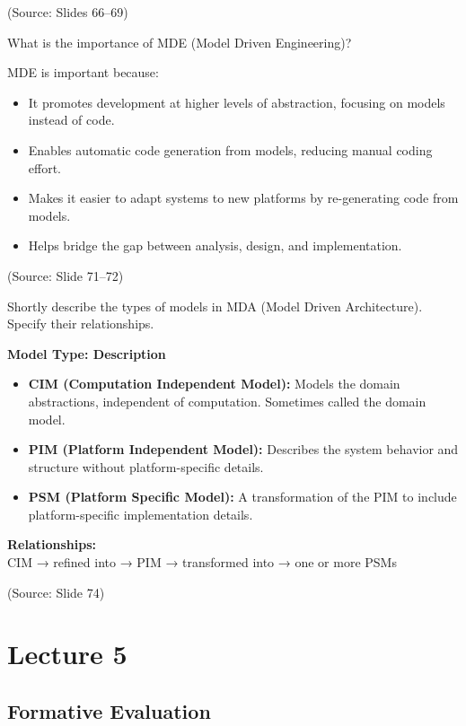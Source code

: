 \documentclass[12pt]{article}
\begin{document}
(Source: Slides 66--69)

\begin{questionbox}
What is the importance of MDE (Model Driven Engineering)?
\end{questionbox}

MDE is important because:
\begin{itemize}
    \item It promotes development at higher levels of abstraction, focusing on models instead of code.
    \item Enables automatic code generation from models, reducing manual coding effort.
    \item Makes it easier to adapt systems to new platforms by re-generating code from models.
    \item Helps bridge the gap between analysis, design, and implementation.
\end{itemize}

(Source: Slide 71--72)

\begin{questionbox}
Shortly describe the types of models in MDA (Model Driven Architecture). Specify their relationships.
\end{questionbox}

\textbf{Model Type: Description}
\begin{itemize}
    \item \textbf{CIM (Computation Independent Model):} Models the domain abstractions, independent of computation. Sometimes called the domain model.
    \item \textbf{PIM (Platform Independent Model):} Describes the system behavior and structure without platform-specific details.
    \item \textbf{PSM (Platform Specific Model):} A transformation of the PIM to include platform-specific implementation details.
\end{itemize}

\textbf{Relationships:}\\
CIM → refined into → PIM → transformed into → one or more PSMs

(Source: Slide 74)

\newpage
\section{Lecture 5}

\subsection{Formative Evaluation}
\end{document}
